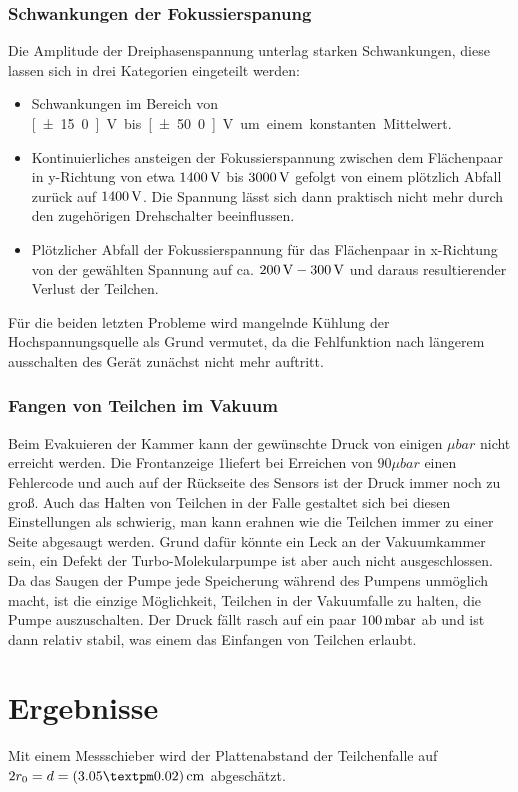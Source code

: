 \documentclass[a4paper,12pt]{article}
\begin{document}
\subsubsection*{Schwankungen der Fokussierspanung}
Die Amplitude der Dreiphasenspannung unterlag starken Schwankungen, diese lassen sich in drei Kategorien eingeteilt werden:
\begin{itemize}
\item
Schwankungen im Bereich von \unit[±15.0]{V} bis \unit[±50.0]{V} um einem konstanten Mittelwert.
\item
Kontinuierliches ansteigen der Fokussierspannung zwischen dem Flächenpaar in y-Richtung von etwa $\unit[1400]{V}$ bis $\unit[3000]{V}$ gefolgt von einem plötzlich
Abfall zurück auf $\unit[1400]{V}$. Die Spannung lässt sich dann praktisch nicht mehr durch den zugehörigen Drehschalter beeinflussen.
\item
Plötzlicher Abfall der Fokussierspannung für das Flächenpaar in x-Richtung von der gewählten Spannung auf ca. $\unit[200]{V} - \unit[300]{V}$ und daraus resultierender
Verlust der Teilchen.
\end{itemize}
Für die beiden letzten Probleme wird mangelnde Kühlung der Hochspannungsquelle als Grund vermutet, da die Fehlfunktion nach längerem ausschalten des Gerät zunächst nicht mehr auftritt.

\subsubsection*{Fangen von Teilchen im Vakuum}
Beim Evakuieren der Kammer kann der gewünschte Druck von einigen $\unit{μbar}$ nicht erreicht werden.
Die Frontanzeige 1liefert bei Erreichen von $90μbar$ einen Fehlercode und auch auf der Rückseite des Sensors ist der Druck immer noch zu groß.
Auch das Halten von Teilchen in der Falle gestaltet sich bei diesen Einstellungen als schwierig, man kann erahnen wie die Teilchen immer zu einer Seite abgesaugt werden.
Grund dafür könnte ein Leck an der Vakuumkammer sein, ein Defekt der Turbo-Molekularpumpe ist aber auch nicht ausgeschlossen.
Da das Saugen der Pumpe jede Speicherung während des Pumpens unmöglich macht, ist die einzige Möglichkeit, Teilchen in der Vakuumfalle zu halten, die Pumpe auszuschalten.
Der Druck fällt rasch auf ein paar $\unit[100] {mbar}$ ab und ist dann relativ stabil, was einem das Einfangen von Teilchen erlaubt.

\section{Ergebnisse}\label{Ergebnisse}
Mit einem Messschieber wird der Plattenabstand der Teilchenfalle auf $2r_0 = d = \unit[(3.05±0.02)]{cm}$ abgeschätzt.
\end{document}
